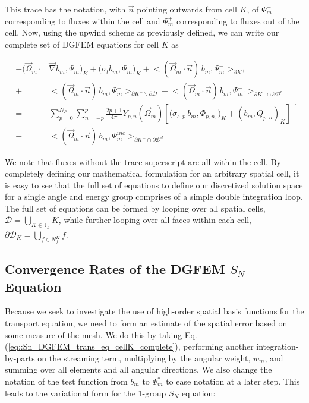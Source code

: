 \noindent This trace has the notation, with $\vec{n}$ pointing outwards from cell $K$, of $\Psi_m^-$ corresponding to fluxes within the cell and $\Psi_m^+$ corresponding to fluxes out of the cell. Now, using the upwind scheme as previously defined, we can write our complete set of DGFEM equations for cell $K$ as

\begin{equation}
\label{eq::Sn_DGFEM_trans_eq_cellK_complete}
\begin{aligned}
-  \Big( \vec{\Omega}_m \cdot  & \vec{\nabla} b_m, \Psi_{m} \Big)_{K}   + \Big(  \sigma_{t} b_m ,   \Psi_{m} \Big)_{K} +  \Big< ( \vec{\Omega}_m \cdot \vec{n} ) \, b_m, {\Psi}_m^{-}  \Big>_{\partial K^+}  \\
  + & \Big< ( \vec{\Omega}_m \cdot \vec{n} ) \, b_m, {\Psi}_m^{+}  \Big>_{\partial K^- \backslash \partial \mathcal{D}}  + \Big< ( \vec{\Omega}_m \cdot \vec{n} ) \, b_m, {\Psi}^{-}_{m'}  \Big>_{\partial K^- \cap \partial \mathcal{D}^r}  \\
= & \sum_{p=0}^{N_P} \sum_{n=-p}^{p} \frac{2p + 1}{4 \pi}  Y_{p,n} (  \vec{\Omega}_m ) \left[ \Big( \sigma_{s,p} \, b_m,  \Phi_{p,n,} \Big)_{K}  + \left(  b_m ,   Q_{p,n} \right)_{K} \right] \\
- & \Big< ( \vec{\Omega}_m \cdot \vec{n} ) \, b_m, {\Psi}_m^{inc}  \Big>_{\partial K^- \cap \partial \mathcal{D}^d}
\end{aligned} .
\end{equation} 

\noindent We note that fluxes without the trace superscript are all within the cell. By completely defining our mathematical formulation for an arbitrary spatial cell, it is easy to see that the full set of equations to define our discretized solution space for a single angle and energy group comprises of a simple double integration loop. The full set of equations can be formed by looping over all spatial cells, $\mathcal{D} = \bigcup_{K \in \mathbb{T}_h} K$, while further looping over all faces within each cell, $\partial \mathcal{D}_K = \bigcup_{ f \in N_f^K} f$. 

\subsection{Convergence Rates of the DGFEM $S_N$ Equation}
\label{sec::Sn_Spatial_Convergence}

Because we seek to investigate the use of high-order spatial basis functions for the transport equation, we need to form an estimate of the spatial error based on some measure of the mesh. We do this by taking Eq. (\ref{eq::Sn_DGFEM_trans_eq_cellK_complete}), performing another integration-by-parts on the streaming term, multiplying by the angular weight, $w_m$, and summing over all elements and all angular directions. We also change the notation of the test function from $b_m$ to $\Psi_m^{*}$ to ease notation at a later step. This leads to the variational form for the 1-group $S_N$ equation:


